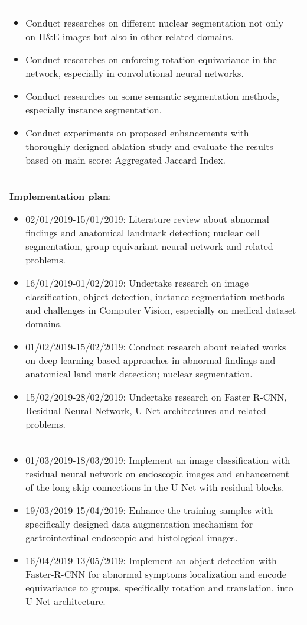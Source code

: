 \begin{longtable}{|l|c|}
{\begin{itemize}
\item Conduct researches on different nuclear segmentation not only on H\&E images but also in other related domains. 

\item Conduct researches on enforcing rotation equivariance in the network, especially in convolutional neural networks.

\item Conduct researches on some semantic segmentation methods, especially instance segmentation.

\item Conduct experiments on proposed enhancements with thoroughly designed ablation study and evaluate the results based on main score: Aggregated Jaccard Index.

\end{itemize}}\\
\multicolumn{2}{|m{\linewidth}|}{
\textbf{Implementation plan}:
\begin{itemize}
\item 02/01/2019-15/01/2019: Literature review about abnormal findings and anatomical landmark detection; nuclear cell segmentation, group-equivariant neural network and related problems.
\item 16/01/2019-01/02/2019: Undertake research on image classification, object detection, instance segmentation methods and challenges in Computer Vision, especially on medical dataset domains.
\item 01/02/2019-15/02/2019: Conduct research about related works on deep-learning based approaches in abnormal findings and anatomical land mark detection; nuclear segmentation.
\item 15/02/2019-28/02/2019: Undertake research on Faster R-CNN, Residual Neural Network, U-Net architectures and related problems.
\end{itemize}}\\
\hline
\multicolumn{2}{|m{\linewidth}|}{
\begin{itemize}
\item 01/03/2019-18/03/2019: Implement an image classification with residual neural network on endoscopic images and enhancement of the long-skip connections in the U-Net with residual blocks.
\item 19/03/2019-15/04/2019: Enhance the training samples with specifically designed data augmentation mechanism for gastrointestinal endoscopic and histological images.
\item 16/04/2019-13/05/2019: Implement an object detection with Faster-R-CNN for abnormal symptoms localization and encode equivariance to groups, specifically rotation and translation, into U-Net architecture.

\end{itemize}}
\end{longtable}
